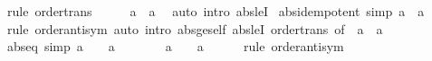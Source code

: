 \begin{isabellebody}
\ {\isacharparenleft}{\kern0pt}rule\ order{\isacharunderscore}{\kern0pt}trans{\isacharparenright}{\kern0pt}\isanewline
\ \ \isamarkupfalse%
\ \isamarkupfalse%
\ {\isachardoublequoteopen}{\isasymbar}a{\isasymbar}\ {\isasymle}\ a{\isachardoublequoteclose}\ \isamarkupfalse%
\ {\isacharparenleft}{\kern0pt}auto\ intro{\isacharcolon}{\kern0pt}\ abs{\isacharunderscore}{\kern0pt}leI{\isacharparenright}{\kern0pt}\isanewline
{}\isamarkupfalse%
%
\endisatagproof
{\isafoldproof}%
%
\isadelimproof
\isanewline
%
\endisadelimproof
\isanewline
{}\isamarkupfalse%
\ abs{\isacharunderscore}{\kern0pt}idempotent\ {\isacharbrackleft}{\kern0pt}simp{\isacharbrackright}{\kern0pt}{\isacharcolon}{\kern0pt}\ {\isachardoublequoteopen}{\isasymbar}{\isasymbar}a{\isasymbar}{\isasymbar}\ {\isacharequal}{\kern0pt}\ {\isasymbar}a{\isasymbar}{\isachardoublequoteclose}\isanewline
%
\isadelimproof
\ \ %
\endisadelimproof
%
\isatagproof
{}\isamarkupfalse%
\ {\isacharparenleft}{\kern0pt}rule\ order{\isachardot}{\kern0pt}antisym{\isacharparenright}{\kern0pt}\ {\isacharparenleft}{\kern0pt}auto\ intro{\isacharbang}{\kern0pt}{\isacharcolon}{\kern0pt}\ abs{\isacharunderscore}{\kern0pt}ge{\isacharunderscore}{\kern0pt}self\ abs{\isacharunderscore}{\kern0pt}leI\ order{\isacharunderscore}{\kern0pt}trans\ {\isacharbrackleft}{\kern0pt}of\ {\isachardoublequoteopen}{\isacharminus}{\kern0pt}\ {\isasymbar}a{\isasymbar}{\isachardoublequoteclose}\ {}\ {\isachardoublequoteopen}{\isasymbar}a{\isasymbar}{\isachardoublequoteclose}{\isacharbrackright}{\kern0pt}{\isacharparenright}{\kern0pt}%
\endisatagproof
{\isafoldproof}%
%
\isadelimproof
\isanewline
%
\endisadelimproof
\isanewline
{}\isamarkupfalse%
\ abs{\isacharunderscore}{\kern0pt}eq{\isacharunderscore}{\kern0pt}{}\ {\isacharbrackleft}{\kern0pt}simp{\isacharbrackright}{\kern0pt}{\isacharcolon}{\kern0pt}\ {\isachardoublequoteopen}{\isasymbar}a{\isasymbar}\ {\isacharequal}{\kern0pt}\ {}\ {\isasymlongleftrightarrow}\ a\ {\isacharequal}{\kern0pt}\ {}{\isachardoublequoteclose}\isanewline
%
\isadelimproof
%
\endisadelimproof
%
\isatagproof
{}\isamarkupfalse%
\ {\isacharminus}{\kern0pt}\isanewline
\ \ \isamarkupfalse%
\ {\isachardoublequoteopen}{\isasymbar}a{\isasymbar}\ {\isacharequal}{\kern0pt}\ {}\ {\isasymLongrightarrow}\ a\ {\isacharequal}{\kern0pt}\ {}{\isachardoublequoteclose}\isanewline
\ \ \isamarkupfalse%
\ {\isacharparenleft}{\kern0pt}rule\ order{\isachardot}{\kern0pt}antisym{\isacharparenright}{\kern0pt}\isanewline

\end{isabellebody}
